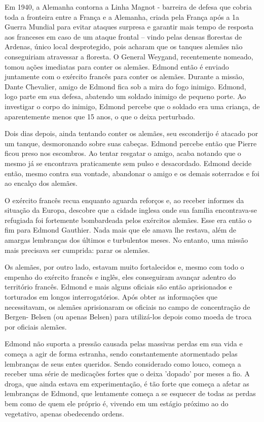 \documentclass[12pt]{article}
\begin{document}
    Em 1940, a Alemanha contorna a Linha Magnot - barreira de defesa que cobria toda a fronteira entre a França e a Alemanha, criada pela França após a 1a Guerra Mundial para evitar ataques surpresa e garantir mais tempo de resposta aos franceses em caso de um ataque frontal – vindo pelas densas florestas de Ardenas, único local desprotegido, pois acharam que os tanques alemães não conseguiriam atravessar a floresta. O General Weygand, recentemente nomeado, tomou ações imediatas para conter os alemães. Edmond então é enviado juntamente com o exército francês para conter os alemães. Durante a missão, Dante Chevalier, amigo de Edmond fica sob a mira do fogo inimigo. Edmond, logo parte em sua defesa, abatendo um soldado inimigo de pequeno porte. Ao investigar o corpo do inimigo, Edmond percebe que o soldado era uma criança, de aparentemente menos que 15 anos, o que o deixa perturbado. 
    
    Dois dias depois, ainda tentando conter os alemães, seu esconderijo é atacado por um tanque, desmoronando sobre suas cabeças. Edmond percebe então que Pierre ficou preso nos escombros. Ao tentar resgatar o amigo, acaba notando que o mesmo já se encontrava praticamente sem pulso e desacordado. Edmond decide então, mesmo contra sua vontade, abandonar o amigo e os demais soterrados e foi ao encalço dos alemães.
    
    O exército francês recua enquanto aguarda reforços e, ao receber informes da situação da Europa, descobre que a cidade inglesa onde sua família encontrava-se refugiada foi fortemente bombardeada pelos exércitos alemães. Esse era então o fim para Edmond Gauthier. Nada mais que ele amava lhe restava, além de amargas lembranças dos últimos e turbulentos meses. No entanto, uma missão mais precisava ser cumprida: parar os alemães.
    
    Os alemães, por outro lado, estavam muito fortalecidos e, mesmo com todo o empenho do exército francês e inglês, eles conseguiram avançar adentro do território francês. Edmond e mais alguns oficiais são então aprisionados e torturados em longos interrogatórios. Após obter as informações que necessitavam, os alemães aprisionaram os oficiais no campo de concentração de Bergen- Belsen (ou apenas Belsen) para utilizá-los depois como moeda de troca por oficiais alemães.
    
    Edmond não suporta a pressão causada pelas massivas perdas em sua vida e começa a agir de forma estranha, sendo constantemente atormentado pelas lembranças de seus entes queridos. Sendo considerado como louco, começa a receber uma série de medicações fortes que o deixa 'dopado' por meses a fio. A droga, que ainda estava em experimentação,  é tão forte que começa a afetar as lembranças de Edmond, que lentamente começa a se esquecer de todas as perdas bem como de quem ele próprio é, vivendo em um estágio próximo ao do vegetativo, apenas obedecendo ordens.
    
\end{document}

